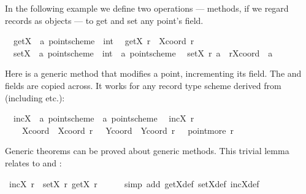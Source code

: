 \begin{isabellebody}
\begin{isamarkuptext}
  In the following example we define two operations --- methods, if we
  regard records as objects --- to get and set any point's  field.%
\end{isamarkuptext}%
\isamarkuptrue%
\isanewline
\ \ getX\ {\isacharcolon}{\isacharcolon}\ {\isachardoublequote}{\isacharprime}a\ point{\isacharunderscore}scheme\ {\isasymRightarrow}\ int{\isachardoublequote}\isanewline
\ \ {\isachardoublequote}getX\ r\ {\isasymequiv}\ Xcoord\ r{\isachardoublequote}\isanewline
\ \ setX\ {\isacharcolon}{\isacharcolon}\ {\isachardoublequote}{\isacharprime}a\ point{\isacharunderscore}scheme\ {\isasymRightarrow}\ int\ {\isasymRightarrow}\ {\isacharprime}a\ point{\isacharunderscore}scheme{\isachardoublequote}\isanewline
\ \ {\isachardoublequote}setX\ r\ a\ {\isasymequiv}\ r{\isasymlparr}Xcoord\ {\isacharcolon}{\isacharequal}\ a{\isasymrparr}{\isachardoublequote}\isamarkupfalse%
%
\begin{isamarkuptext}%
Here is a generic method that modifies a point, incrementing its
   field.  The  and  fields
  are copied across.  It works for any record type scheme derived from
   (including  etc.):%
\end{isamarkuptext}%
\isamarkuptrue%
\isanewline
\ \ incX\ {\isacharcolon}{\isacharcolon}\ {\isachardoublequote}{\isacharprime}a\ point{\isacharunderscore}scheme\ {\isasymRightarrow}\ {\isacharprime}a\ point{\isacharunderscore}scheme{\isachardoublequote}\isanewline
\ \ {\isachardoublequote}incX\ r\ {\isasymequiv}\isanewline
\ \ \ \ {\isasymlparr}Xcoord\ {\isacharequal}\ Xcoord\ r\ {\isacharplus}\ {}{\isacharcomma}\ Ycoord\ {\isacharequal}\ Ycoord\ r{\isacharcomma}\ {\isasymdots}\ {\isacharequal}\ point{\isachardot}more\ r{\isasymrparr}{\isachardoublequote}\isamarkupfalse%
%
\begin{isamarkuptext}%
Generic theorems can be proved about generic methods.  This trivial
  lemma relates  to  and :%
\end{isamarkuptext}%
\isamarkuptrue%
\ {\isachardoublequote}incX\ r\ {\isacharequal}\ setX\ r\ {\isacharparenleft}getX\ r\ {\isacharplus}\ {}{\isacharparenright}{\isachardoublequote}\isanewline
\ \ \isamarkupfalse%
\ {\isacharparenleft}simp\ add{\isacharcolon}\ getX{\isacharunderscore}def\ setX{\isacharunderscore}def\ incX{\isacharunderscore}def{\isacharparenright}\isamarkupfalse%
%
\begin{isamarkuptext}%

\end{isamarkuptext}
\end{isabellebody}
